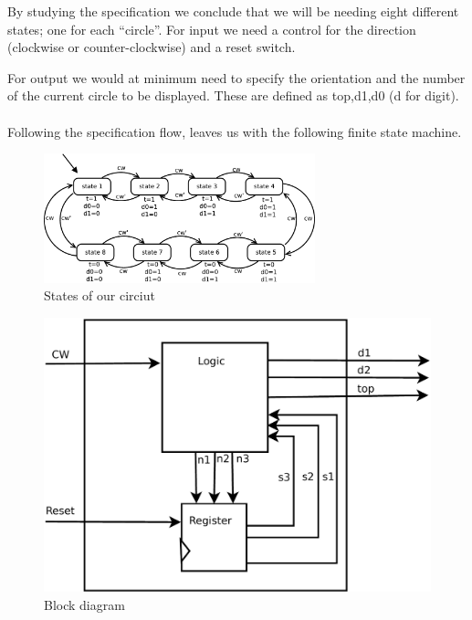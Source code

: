 By studying the specification we conclude that we will be needing
eight different states; one for each {}``circle''. For input we
need a control for the direction (clockwise or counter-clockwise)
and a reset switch.

For output we would at minimum need to specify the orientation and
the number of the current circle to be displayed. These are defined
as top,d1,d0 (d for digit).\\
\\
Following the specification flow, leaves us with the following
finite state machine.

\begin{figure}[!htbp] 
	\centering 
        \includegraphics[width=0.7\textwidth]{fig/FSM_states.pdf}
	\caption{States of our circiut}
	\label{fig:states} 
\end{figure}


\begin{figure}[!htbp] 
	\centering 
        \includegraphics[height=0.4\textwidth]{fig/Block_diagram.pdf}
	\caption{Block diagram}
	\label{fig:block_diagram} 
\end{figure}
